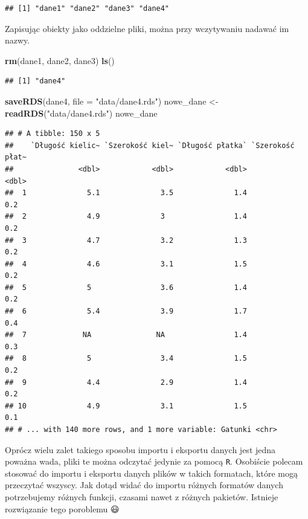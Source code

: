\documentclass[]{book}
\newenvironment{Shaded}{\begin{snugshade}}{\end{snugshade}}
\newcommand{\DataTypeTok}[1]{\textcolor[rgb]{0.13,0.29,0.53}{#1}}
\newcommand{\KeywordTok}[1]{\textcolor[rgb]{0.13,0.29,0.53}{\textbf{#1}}}
\newcommand{\NormalTok}[1]{#1}
\newcommand{\StringTok}[1]{\textcolor[rgb]{0.31,0.60,0.02}{#1}}
\theoremstyle{plain}
\theoremstyle{definition}
\begin{document}
\begin{verbatim}
## [1] "dane1" "dane2" "dane3" "dane4"
\end{verbatim}

Zapisując obiekty jako oddzielne pliki, można przy wczytywaniu nadawać im nazwy.

\begin{Shaded}
\begin{Highlighting}[]
\KeywordTok{rm}\NormalTok{(dane1, dane2, dane3)}
\KeywordTok{ls}\NormalTok{()}
\end{Highlighting}
\end{Shaded}

\begin{verbatim}
## [1] "dane4"
\end{verbatim}

\begin{Shaded}
\begin{Highlighting}[]
\KeywordTok{saveRDS}\NormalTok{(dane4, }\DataTypeTok{file =} \StringTok{"data/dane4.rds"}\NormalTok{)}
\NormalTok{nowe_dane <-}\StringTok{ }\KeywordTok{readRDS}\NormalTok{(}\StringTok{"data/dane4.rds"}\NormalTok{)}
\NormalTok{nowe_dane}
\end{Highlighting}
\end{Shaded}

\begin{verbatim}
## # A tibble: 150 x 5
##    `Długość kielic~ `Szerokość kiel~ `Długość płatka` `Szerokość płat~
##               <dbl>            <dbl>            <dbl>            <dbl>
##  1              5.1              3.5              1.4              0.2
##  2              4.9              3                1.4              0.2
##  3              4.7              3.2              1.3              0.2
##  4              4.6              3.1              1.5              0.2
##  5              5                3.6              1.4              0.2
##  6              5.4              3.9              1.7              0.4
##  7             NA               NA                1.4              0.3
##  8              5                3.4              1.5              0.2
##  9              4.4              2.9              1.4              0.2
## 10              4.9              3.1              1.5              0.1
## # ... with 140 more rows, and 1 more variable: Gatunki <chr>
\end{verbatim}

Oprócz wielu zalet takiego sposobu importu i eksportu danych jest jedna poważna wada, pliki te można odczytać jedynie za pomocą \texttt{R}. Osobiście polecam stosować do importu i eksportu danych plików w takich formatach, które mogą przeczytać wszyscy. Jak dotąd widać do importu różnych formatów danych potrzebujemy różnych funkcji, czasami nawet z różnych pakietów. Istnieje rozwiązanie tego poroblemu 😃
\end{document}
